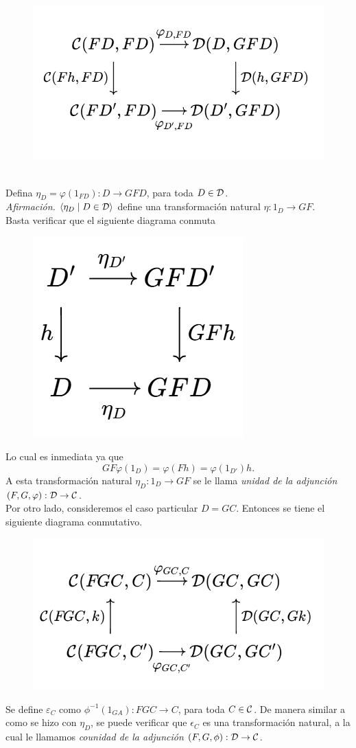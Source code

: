         \begin{figure}[H]
        \centering
        \includegraphics[width=0.45\linewidth]{img/diagram1.4.3.png}
    \end{figure}
    \text{}\\
    Defina $\eta_D=\varphi(1_{FD}):D\to GFD$, para toda $D\in {\mathcal D}$.\\
    \emph{Afirmación. } $\langle \eta_D\mid D\in{\mathcal D}\rangle$ define una transformación natural $\eta:1_D\to GF$. \\
    Basta verificar que el siguiente diagrama conmuta
        \begin{figure}[H]
        \centering
        \includegraphics[width=0.2\linewidth]{img/diagram1.4.4.png}
    \end{figure}
    Lo cual es inmediata ya que 
    \begin{equation*}
        GF\varphi(1_D)=\varphi(Fh)=\varphi(1_{D'})h.
    \end{equation*}
    A esta transformación natural $\eta_D:1_D\to GF$ se le llama \emph{unidad de la adjunción} $(F,G,\varphi):{\mathcal D}\to{\mathcal C}$.\\
    Por otro lado, consideremos el caso particular $D=GC$. Entonces se tiene el siguiente diagrama conmutativo. 
           \begin{figure}[H]
        \centering
        \includegraphics[width=0.45\linewidth]{img/diagram1.4.5.png}
    \end{figure}
    Se define $\varepsilon_C$ como $\phi^{-1}(1_{GA}):FGC\to C$, para toda $C\in {\mathcal C}$. De manera similar a como se hizo con $\eta_D$, se puede verificar que $\epsilon_C$ es una transformación natural, a la cual le llamamos \emph{counidad de la adjunción} $(F,G,\phi): {\mathcal D}\to {\mathcal C}$.
